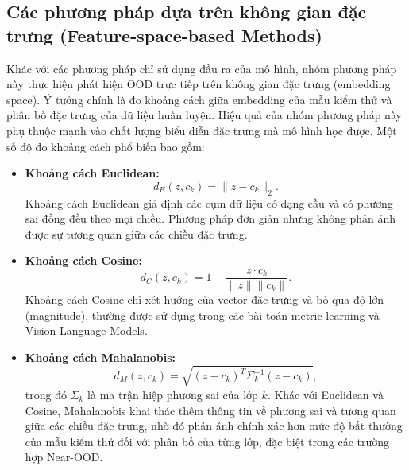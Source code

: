 \subsection{Các phương pháp dựa trên không gian đặc trưng (Feature-space-based Methods)} 
Khác với các phương pháp chỉ sử dụng đầu ra của mô hình, nhóm phương pháp này thực hiện phát hiện OOD trực tiếp trên không gian đặc trưng (embedding space). Ý tưởng chính là đo khoảng cách giữa embedding của mẫu kiểm thử và phân bố đặc trưng của dữ liệu huấn luyện. Hiệu quả của nhóm phương pháp này phụ thuộc mạnh vào chất lượng biểu diễn đặc trưng mà mô hình học được. Một số độ đo khoảng cách phổ biến bao gồm: 
\begin{itemize} 
  \item \textbf{Khoảng cách Euclidean:} 
  \[ d_E(z,c_k)=\|z-c_k\|_2. \] 
  Khoảng cách Euclidean giả định các cụm dữ liệu có dạng cầu và có phương sai đồng đều theo mọi chiều. Phương pháp đơn giản nhưng không phản ánh được sự tương quan giữa các chiều đặc trưng. 
  \item \textbf{Khoảng cách Cosine:} 
  \[ d_C(z,c_k)=1-\frac{z\cdot c_k}{\|z\|\|c_k\|}. \] 
  Khoảng cách Cosine chỉ xét hướng của vector đặc trưng và bỏ qua độ lớn (magnitude), thường được sử dụng trong các bài toán metric learning và Vision-Language Models. 
  \item \textbf{Khoảng cách Mahalanobis:} 
  \[ d_M(z,c_k)=\sqrt{(z-c_k)^T\Sigma_k^{-1}(z-c_k)}, \] 
  trong đó $\Sigma_k$ là ma trận hiệp phương sai của lớp $k$. Khác với Euclidean và Cosine, Mahalanobis khai thác thêm thông tin về phương sai và tương quan giữa các chiều đặc trưng, nhờ đó phản ánh chính xác hơn mức độ bất thường của mẫu kiểm thử đối với phân bố của từng lớp, đặc biệt trong các trường hợp Near-OOD. 
\end{itemize} 

